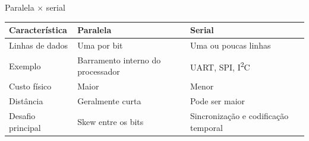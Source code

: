 \begin{frame}{Paralela \texorpdfstring{$\times$}{x} serial}
  \small
  \begin{tabularx}{\linewidth}{@{}>{\raggedright\arraybackslash}X|>{\raggedright\arraybackslash}X|>{\raggedright\arraybackslash}X@{}}
    \textbf{Característica} & \textbf{Paralela} & \textbf{Serial} \\ \hline
    Linhas de dados & Uma por bit & Uma ou poucas linhas \\ \hline
    Exemplo & Barramento interno do processador & UART, SPI, I\textsuperscript{2}C \\ \hline
    Custo físico & Maior & Menor \\ \hline
    Distância & Geralmente curta & Pode ser maior \\ \hline
    Desafio principal & Skew entre os bits & Sincronização e codificação temporal
  \end{tabularx}
\end{frame}